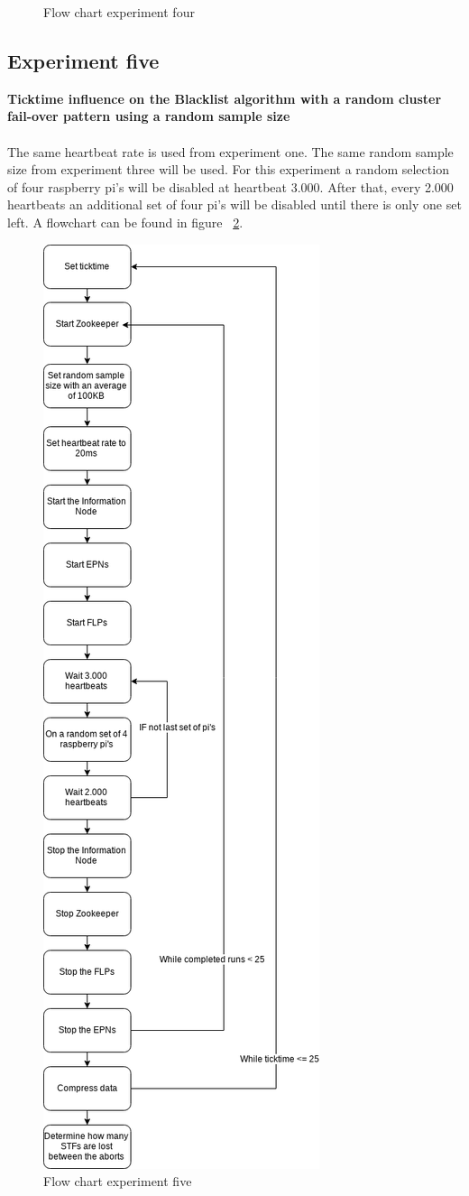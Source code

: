 \begin{figure}[htb]
	\caption{Flow chart experiment four}
	\label{fig:FlowChart4}
\end{figure}

\subsection{Experiment five}
\textbf{Ticktime influence on the Blacklist algorithm with a random cluster fail-over pattern using a random sample size}
\\~\\
The same heartbeat rate is used from experiment one. The same random sample size from experiment three will be used. For this experiment a random selection of four raspberry pi's will be disabled at heartbeat 3.000. After that, every 2.000 heartbeats an additional set of four pi's will be disabled until there is only one set left. A flowchart can be found in figure ~\ref{fig:FlowChart5}.

\begin{figure}[htb]
	\centering
	\includegraphics[scale=0.3]{./graphics/ex5.png}
	\caption{Flow chart experiment five}
	\label{fig:FlowChart5}
\end{figure}